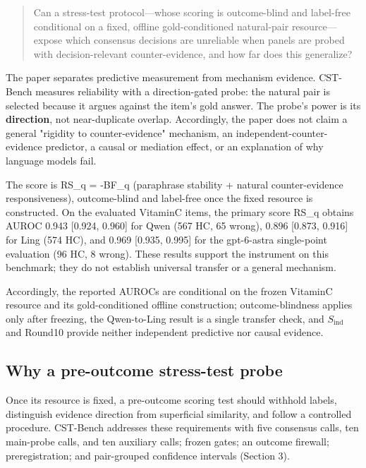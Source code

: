 \documentclass[11pt]{article}
\begin{document}
\begin{quote}
Can a stress-test protocol---whose scoring is outcome-blind and label-free conditional on a fixed, offline gold-conditioned natural-pair resource---expose which consensus decisions are unreliable when panels are probed with decision-relevant counter-evidence, and how far does this generalize?
\end{quote}

The paper separates predictive measurement from mechanism evidence. CST-Bench measures reliability with a direction-gated probe: the natural pair is selected because it argues against the item's gold answer. The probe's power is its \textbf{direction}, not near-duplicate overlap. Accordingly, the paper does not claim a general "rigidity to counter-evidence" mechanism, an independent-counter-evidence predictor, a causal or mediation effect, or an explanation of why language models fail.

The score is RS\_\allowbreak{}q = -BF\_\allowbreak{}q (paraphrase stability + natural counter-evidence responsiveness), outcome-blind and label-free once the fixed resource is constructed. On the evaluated VitaminC items, the primary score RS\_\allowbreak{}q obtains AUROC 0.943 [0.924, 0.960] for Qwen (567 HC, 65 wrong), 0.896 [0.873, 0.916] for Ling (574 HC), and 0.969 [0.935, 0.995] for the gpt-6-astra single-point evaluation (96 HC, 8 wrong). These results support the instrument on this benchmark; they do not establish universal transfer or a general mechanism.

Accordingly, the reported AUROCs are conditional on the frozen VitaminC resource and its gold-conditioned offline construction; outcome-blindness applies only after freezing, the Qwen-to-Ling result is a single transfer check, and \(S_{\mathrm{ind}}\) and Round10 provide neither independent predictive nor causal evidence.

\subsection{Why a pre-outcome stress-test probe}

Once its resource is fixed, a pre-outcome scoring test should withhold labels, distinguish evidence direction from superficial similarity, and follow a controlled procedure. CST-Bench addresses these requirements with five consensus calls, ten main-probe calls, and ten auxiliary calls; frozen gates; an outcome firewall; preregistration; and pair-grouped confidence intervals (Section 3).
\end{document}
